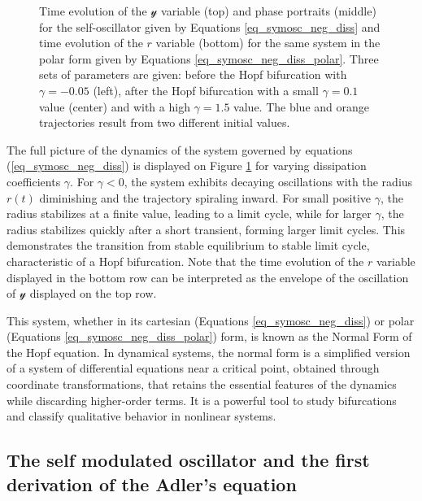 \documentclass{article}
\begin{document}
\begin{figure} [h]
    \centerline{}
    \caption{Time evolution of the $\mathscr{y}$ variable (top) and phase portraits (middle) for the self-oscillator given by Equations \ref{eq_symosc_neg_diss} and time evolution of the $r$ variable (bottom) for the same system in the polar form given by Equations \ref{eq_symosc_neg_diss_polar}. 
    Three sets of parameters are given: before the Hopf bifurcation with $\gamma = -0.05$ (left), after the Hopf bifurcation with a small $\gamma = 0.1$ value (center) and with a high $\gamma = 1.5$ value.
    The blue and orange trajectories result from two different initial values.}
    \label{fig_symself}
\end{figure}

The full picture of the dynamics of the system governed by equations (\ref{eq_symosc_neg_diss}) is displayed on Figure \ref{fig_symself} for varying dissipation coefficients $\gamma$. 
For $\gamma < 0$, the system exhibits decaying oscillations with the radius $r(t)$ diminishing and the trajectory spiraling inward. For small positive $\gamma$, the radius stabilizes at a finite value, leading to a limit cycle, while for larger $\gamma$, the radius stabilizes quickly after a short transient, forming larger limit cycles. This demonstrates the transition from stable equilibrium to stable limit cycle, characteristic of a Hopf bifurcation. 
Note that the time evolution of the $r$ variable displayed in the bottom row can be interpreted as the envelope of the oscillation of $\mathscr{y}$ displayed on the top row. 

This system, whether in its cartesian (Equations {\ref{eq_symosc_neg_diss}}) or polar (Equations \ref{eq_symosc_neg_diss_polar}) form, is known as the Normal Form of the Hopf equation. 
In dynamical systems, the normal form is a simplified version of a system of differential equations near a critical point, obtained through coordinate transformations, that retains the essential features of the dynamics while discarding higher-order terms. 
It is a powerful tool to study bifurcations and classify qualitative behavior in nonlinear systems.



\subsection{The self modulated oscillator and the first derivation of the Adler's equation}
\end{document}
